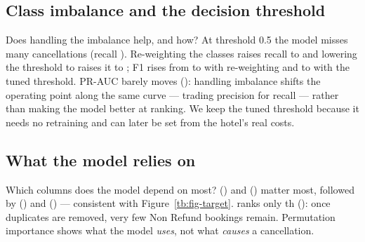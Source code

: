 \subsection{Class imbalance and the decision threshold}\label{tb:imbalance}
\begin{table}[H]\centering\small
\caption{Three ways to handle the imbalance, on the tuned HGB model (validation set).}\label{tb:tab-imbalance}

\end{table}
\begin{finding}
\Q Does handling the imbalance help, and how?
\F At threshold 0.5 the model misses many cancellations (recall \TBImbDefR). Re-weighting the classes raises recall to
\TBImbBalR{} and lowering the threshold to \TBThr{} raises it to \TBImbThrR; F1 rises from \TBImbDefF{} to \TBImbBalF{} with
re-weighting and to \TBImbThrF{} with the tuned threshold. PR-AUC barely moves (\TBImbDefPR): handling imbalance shifts the operating point along the same
curve — trading precision for recall — rather than making the model better at ranking. We keep the tuned threshold because
it needs no retraining and can later be set from the hotel's real costs.
\end{finding}

\subsection{What the model relies on}
\begin{finding}
\Q Which columns does the model depend on most?
\F {} (\TBImpLead) and  (\TBImpCountry) matter most, followed by 
(\TBImpSegment) and  (\TBImpSpecial) — consistent with Figure~\ref{tb:fig-target}.
 ranks only \TBImpDepositRank{}th (\TBImpDeposit): once duplicates are removed, very few Non Refund
bookings remain. Permutation importance shows what the model \emph{uses}, not what \emph{causes} a cancellation.
\end{finding}

